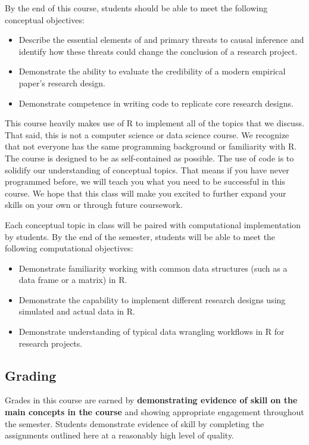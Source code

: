 \documentclass[
  11pt,
]{article}
\begin{document}
By the end of this course, students should be able to meet the following
conceptual objectives:

\begin{itemize}
\item
  Describe the essential elements of and primary threats to causal
  inference and identify how these threats could change the conclusion
  of a research project.
\item
  Demonstrate the ability to evaluate the credibility of a modern
  empirical paper's research design.
\item
  Demonstrate competence in writing code to replicate core research
  designs.
\end{itemize}

This course heavily makes use of R to implement all of the topics that
we discuss. That said, this is not a computer science or data science
course. We recognize that not everyone has the same programming
background or familiarity with R. The course is designed to be as
self-contained as possible. The use of code is to solidify our
understanding of conceptual topics. That means if you have never
programmed before, we will teach you what you need to be successful in
this course. We hope that this class will make you excited to further
expand your skills on your own or through future coursework.

Each conceptual topic in class will be paired with computational
implementation by students. By the end of the semester, students will be
able to meet the following computational objectives:

\begin{itemize}
\item
  Demonstrate familiarity working with common data structures (such as a
  data frame or a matrix) in R.
\item
  Demonstrate the capability to implement different research designs
  using simulated and actual data in R.
\item
  Demonstrate understanding of typical data wrangling workflows in R for
  research projects.
\end{itemize}

\hypertarget{grading}{%
\subsection{Grading}\label{grading}}

Grades in this course are earned by \textbf{demonstrating evidence of
skill on the main concepts in the course} and showing appropriate
engagement throughout the semester. Students demonstrate evidence of
skill by completing the assignments outlined here at a reasonably high
level of quality.
\end{document}
